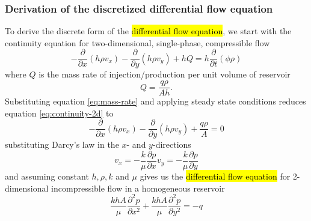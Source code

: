 \subsubsection{Derivation of the discretized differential flow equation} %
\label{ssub:derivation}
To derive the discrete form of the \hl{differential flow equation}, we  start with the continuity equation for two-dimensional, single-phase, compressible flow \cite{Peaceman1977Fundamentals}
\begin{equation}
    \label{eq:continuity-2d}
    - \frac{\partial}{\partial x} \left( h\rho v_x \right) - \frac{\partial}{\partial y} \left( h\rho v_y \right) + hQ = h \frac{\partial }{\partial t} \left( \phi \rho \right)
\end{equation}
where $Q$ is the mass rate of injection/production per unit volume of reservoir
\begin{equation}
    \label{eq:mass-rate}
    Q = \frac{q\rho}{Ah}.
\end{equation}
Substituting equation \eqref{eq:mass-rate} and applying steady state conditions reduces equation \eqref{eq:continuity-2d} to
\begin{equation}
    - \frac{\partial}{\partial x} \left( h\rho v_x \right) - \frac{\partial}{\partial y} \left( h\rho v_y \right) + \frac{q\rho}{A} = 0
\end{equation}
substituting Darcy's law in the $x$- and $y$-directions \cite{Peaceman1977Fundamentals}
\begin{subequations}
    \begin{equation}
        v_x = -\frac{k}{\mu} \frac{\partial p}{\partial x}
    \end{equation}
    \begin{equation}
        v_y = -\frac{k}{\mu} \frac{\partial p}{\partial y}
    \end{equation}
\end{subequations}
and assuming constant $h,\rho,k$ and $\mu$ gives us the \hl{differential flow equation} for 2-dimensional incompressible flow in a homogeneous reservoir
\begin{equation}
    \label{eq:differential-flow}
    \frac{khA}{\mu} \frac{\partial^2 p}{\partial x^2}  + \frac{khA}{\mu} \frac{\partial^2 p}{\partial y^2} = -q
\end{equation}

